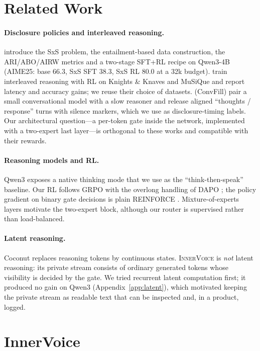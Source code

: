 \documentclass[letterpaper]{article} %
\newcommand{\iv}{\textsc{InnerVoice}}
\begin{document}
\section{Related Work}
\paragraph{Disclosure policies and interleaved reasoning.}
\citet{wei2026sxs} introduce the SxS problem, the entailment-based data construction, the ARI/ABO/AIRW metrics and a two-stage SFT+RL recipe on Qwen3-4B (AIME25: base 66.3, SxS SFT 38.3, SxS RL 80.0 at a 32k budget). \citet{xie2025interleaved} train interleaved reasoning with RL on Knights \& Knaves and MuSiQue and report latency and accuracy gains; we reuse their choice of datasets. \citet{srinivas2025convfill} (ConvFill) pair a small conversational model with a slow reasoner and release aligned ``thoughts / response'' turns with silence markers, which we use as disclosure-timing labels. Our architectural question---a per-token gate inside the network, implemented with a two-expert last layer---is orthogonal to these works and compatible with their rewards.

\paragraph{Reasoning models and RL.} Qwen3 \citep{qwen3} exposes a native thinking mode that we use as the ``think-then-speak'' baseline. Our RL follows GRPO \citep{shao2024deepseekmath,deepseekr1} with the overlong handling of DAPO \citep{yu2025dapo}; the policy gradient on binary gate decisions is plain REINFORCE \citep{williams1992reinforce}. Mixture-of-experts layers \citep{fedus2022switch} motivate the two-expert block, although our router is supervised rather than load-balanced.

\paragraph{Latent reasoning.} Coconut \citep{hao2024coconut} replaces reasoning tokens by continuous states. \iv{} is \emph{not} latent reasoning: its private stream consists of ordinary generated tokens whose visibility is decided by the gate. We tried recurrent latent computation first; it produced no gain on Qwen3 (Appendix~\ref{app:latent}), which motivated keeping the private stream as readable text that can be inspected and, in a product, logged.

\section{InnerVoice}
\end{document}
